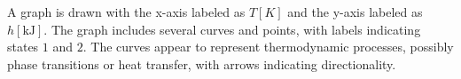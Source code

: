 A graph is drawn with the x-axis labeled as \( T [K] \) and the y-axis labeled as \( h [\text{kJ}] \). The graph includes several curves and points, with labels indicating states \( 1 \) and \( 2 \). The curves appear to represent thermodynamic processes, possibly phase transitions or heat transfer, with arrows indicating directionality.